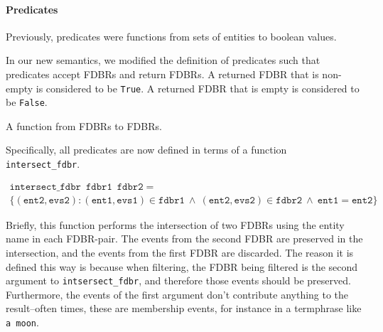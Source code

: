 \documentclass[../main.tex]{subfiles}
\begin{document}
\paragraph{Predicates}
Previously, predicates were functions from sets of entities to boolean values.

In our new semantics, we modified the definition of predicates such that predicates accept FDBRs and return FDBRs.  A returned FDBR that is non-empty is 
considered to be \texttt{True}.  A returned FDBR that is empty is considered to be \texttt{False}.

\begin{definition}[Predicate]
	A function from FDBRs to FDBRs.
\end{definition}

Specifically, all predicates are now defined in terms of a function \texttt{intersect\_fdbr}.

\begin{definition}
	\begin{multline*}
	\mathtt{intersect\_fdbr}\enspace \mathtt{fdbr1}\enspace \mathtt{fdbr2} = \\ \{\mathtt{(ent2, evs2) : (ent1, evs1) }\in \mathtt{fdbr1 \ \wedge\ (ent2, evs2) } \in \mathtt{fdbr2\ \wedge\ ent1 = ent2}\}
	\end{multline*}
\end{definition}

Briefly, this function performs the intersection of two FDBRs using the entity name in each FDBR-pair.  The events from the second FDBR are preserved
in the intersection, and the events from the first FDBR are discarded.  The reason it is defined this way is because when filtering, the FDBR being filtered
is the second argument to \texttt{intsersect\_fdbr}, and therefore those events should be preserved.  Furthermore, the events of the first argument
don't contribute anything to the result--often times, these are membership events, for instance in a termphrase like \texttt{a moon}.
\end{document}
